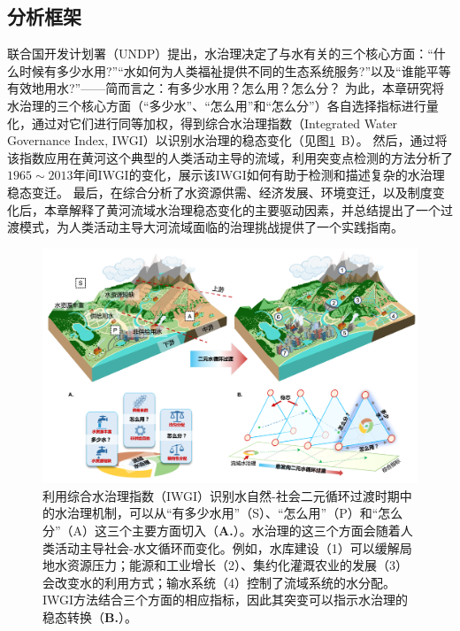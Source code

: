 
\subsection{分析框架}

联合国开发计划署（UNDP）提出\cite{undpwatergovernancefacility2016}，水治理决定了与水有关的三个核心方面：“什么时候有多少水用?”“水如何为人类福祉提供不同的生态系统服务?”以及“谁能平等有效地用水?”——简而言之：有多少水用？怎么用？怎么分？
为此，本章研究将水治理的三个核心方面（“多少水”、“怎么用”和“怎么分”）各自选择指标进行量化，通过对它们进行同等加权，得到综合水治理指数（Integrated Water Governance Index, IWGI）以识别水治理的稳态变化（见图\ref{ch4:fig:framework}~B）。
然后，通过将该指数应用在黄河这个典型的人类活动主导的流域，利用突变点检测的方法分析了$1965\sim2013$年间IWGI的变化，展示该IWGI如何有助于检测和描述复杂的水治理稳态变迁。
最后，在综合分析了水资源供需、经济发展、环境变迁，以及制度变化后，本章解释了黄河流域水治理稳态变化的主要驱动因素，并总结提出了一个过渡模式，为人类活动主导大河流域面临的治理挑战提供了一个实践指南。

\begin{figure}[!ht]
\centering
\includegraphics[width=\textwidth]{img/ch4/ch4_framework.png}
\caption[定量识别流域水治理转变的分析框架]{
    利用综合水治理指数（IWGI）识别水自然-社会二元循环过渡时期中的水治理机制，可以从“有多少水用”（S）、“怎么用”（P）和“怎么分”（A）这三个主要方面切入（\textbf{A.}）。水治理的这三个方面会随着人类活动主导社会-水文循环而变化。例如，水库建设（1）可以缓解局地水资源压力；能源和工业增长（2）、集约化灌溉农业的发展（3）会改变水的利用方式；输水系统（4）控制了流域系统的水分配。IWGI方法结合三个方面的相应指标，因此其突变可以指示水治理的稳态转换（\textbf{B.}）。}\label{ch4:fig:framework}
\end{figure}

